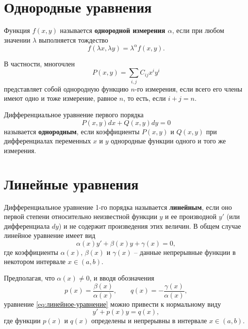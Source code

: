 \documentclass[a5paper, 11pt]{extbook}
\theoremstyle{definition}
\theoremstyle{definition}
\begin{document}
\section{Однородные уравнения}

Функция \(f(x, y)\) называется \textbf{однородной измерения \(\alpha\)}, если при любом значении \(\lambda\) выполняется тождество
\begin{equation}
    f(\lambda x, \lambda y)  = \lambda^{\alpha} f(x, y).
\end{equation}

В частности, многочлен
\[
    P(x, y) = \sum_{i, j} C_{ij} x^i y^i
\]
представляет собой однородную функцию \(n\)-го измерения, если всего его члены имеют одно и тоже измерение, равное \(n\), то есть, если \(i + j = n\).

Дифференциальное уравнение первого порядка
\begin{equation}
    P(x, y) dx + Q(x, y) dy = 0
\end{equation}
называется \textbf{однородным}, если коэффициенты \(P(x, y)\) и \(Q(x, y)\) при дифференциалах переменных \(x\) и \(y\) однородные функции одного и того же измерения.

\section{Линейные уравнения}

Дифференциальное уравнение 1-го порядка называется \textbf{линейным}, если оно первой степени относительно неизвестной функции \(y\) и ее производной \(y'\) (или дифференциала \(dy\)) и не содержит произведения этих величин. В общем случае линейное уравнение имеет вид
\begin{equation}
    \label{eq:линейное-уравнение}
    \alpha(x) y' + \beta(x) y + \gamma(x) = 0,
\end{equation}
где коэффициенты \(\alpha(x)\), \(\beta(x)\) и \(\gamma(x)\) -- данные непрерывные функции в некотором интервале \(x \in (a, b)\).

Предполагая, что \(\alpha(x) \neq 0\), и вводя обозначения
\[
    p(x) = \frac{\beta(x)}{\alpha(x)},
    \qquad
    q(x) = -\frac{\gamma(x)}{\alpha(x)},
\]
уравнение \eqref{eq:линейное-уравнение} можно привести к нормальному виду
\begin{equation}
    \label{eq:нормальное-линейное-уравнение}
    y' + p(x)y = q(x),
\end{equation}
где функции \(p(x)\) и \(q(x)\) определены и непрерывны в интервале \(x \in (a, b)\).
\end{document}
